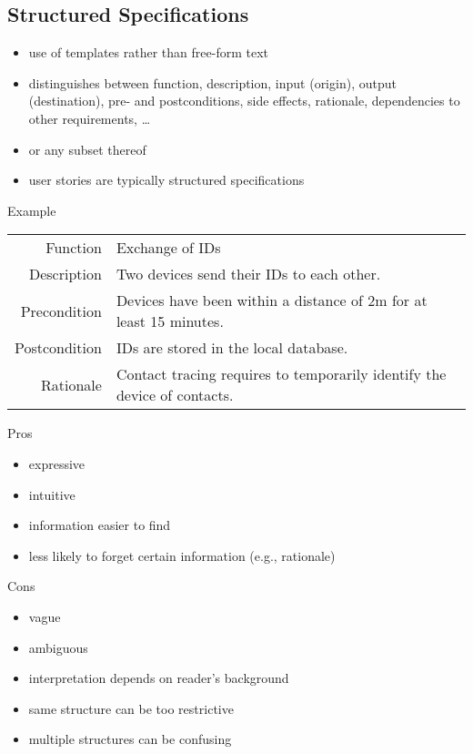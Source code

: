 \subsection{Structured Specifications}
\begin{frame}{\insertsubsection}
	\begin{fancycolumns}[widths={55}]
		\begin{definition}{}
			\begin{itemize}
				\item use of templates rather than free-form text
				\item distinguishes between function, description, input (origin), output (destination), pre- and postconditions, side effects, rationale, dependencies to other requirements, \ldots
				\item or any subset thereof
				\item user stories are typically structured specifications
			\end{itemize}
		\end{definition}
		\begin{example}{Example}
			\setlength\tabcolsep{1mm}
			\begin{tabularx}{\textwidth}{rX}
				Function & Exchange of IDs\\
				Description & Two devices send their IDs to each other.\\
				Precondition & Devices have been within a distance of 2m for at least 15 minutes.\\
				Postcondition & IDs are stored in the local database.\\
				Rationale & Contact tracing requires to temporarily identify the device of contacts.
			\end{tabularx}
		\end{example}
		\nextcolumn
		\begin{note}{Pros}
			\begin{itemize}
				\item {\color{gray} expressive}
				\item {\color{gray} intuitive}
				\item information easier to find
				\item less likely to forget certain information (e.g., rationale)
			\end{itemize}
		\end{note}
		\begin{note}{Cons}
			\begin{itemize}
				\item {\color{gray} vague}
				\item {\color{gray} ambiguous}
				\item {\color{gray} interpretation depends on reader's background}
				\item same structure can be too restrictive
				\item multiple structures can be confusing
			\end{itemize}
		\end{note}
	\end{fancycolumns}
\end{frame}

